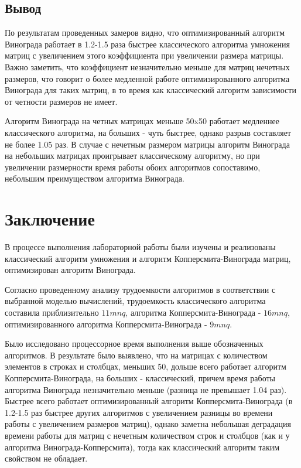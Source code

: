 \documentclass[12pt]{report}
\begin{document}
    \section{Вывод}

    По результатам проведенных замеров видно, что оптимизированный алгоритм Винограда
    работает в 1.2-1.5 раза быстрее классического алгоритма умножения матриц с увеличением этого
    коэффициента при увеличении размера матрицы.
    Важно заметить, что коэффициент незначительно меньше для матриц нечетных размеров,
    что говорит о более медленной работе оптимизированного алгоритма Винограда для таких матриц,
    в то время как классический алгоритм зависимости от четности размеров не имеет.

    Алгоритм Винограда на четных матрицах меньше 50x50 работает медленнее классического алгоритма,
    на больших - чуть быстрее, однако разрыв составляет не более 1.05 раз.
    В случае с нечетным размером матрицы алгоритм Винограда на небольших матрицах проигрывает классическому алгоритму,
    но при увеличении размерности время работы обоих алгоритмов сопоставимо,
    небольшим преимуществом алгоритма Винограда.
    \newpage

    \chapter*{Заключение}
    В процессе выполнения лабораторной работы были изучены и реализованы классический алгоритм
    умножения и алгоритм Копперсмита-Винограда матриц, оптимизирован алгоритм Винограда.

    Согласно проведенному анализу трудоемкости алгоритмов в соответствии с выбранной моделью вычислений,
    трудоемкость классического алгоритма составила приблизительно $11mnq$,
    алгоритма Копперсмита-Винограда - $16mnq$,
    оптимизированного алгоритма Копперсмита-Винограда - $9mnq$.

    Было исследовано процессорное время выполнения выше обозначенных алгоритмов.
    В результате было выявлено, что на матрицах с количеством элементов в строках и столбцах,
    меньших 50, дольше всего работает алгоритм Копперсмита-Винограда, на больших - классический,
    причем время работы алгоритма Винограда незначительно меньше (разница не превышает 1.04 раз).
    Быстрее всего работает оптимизированный алгоритм Копперсмита-Винограда
    (в 1.2-1.5 раз быстрее других алгоритмов с увеличением разницы во времени работы с увеличением размеров матриц),
    однако заметна небольшая деградация времени работы для матриц с нечетным количеством строк и столбцов
    (как и у алгоритма Винограда-Копперсмита),
    тогда как классический алгоритм таким свойством не обладает.


    \newpage

\end{document}
